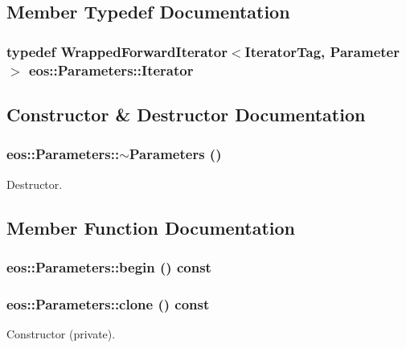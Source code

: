 \subsection{Member Typedef Documentation}
\hypertarget{classeos_1_1Parameters_ad4378a4b3c462f8aa122b3484bce1b4f}{
\subsubsection[{Iterator}]{\setlength{\rightskip}{0pt plus 5cm}typedef {\bf WrappedForwardIterator}$<$IteratorTag, {\bf Parameter}$>$ {\bf eos::Parameters::Iterator}}}
\label{classeos_1_1Parameters_ad4378a4b3c462f8aa122b3484bce1b4f}


\subsection{Constructor \& Destructor Documentation}
\hypertarget{classeos_1_1Parameters_aa1f509653fa20a2599a47706042685f1}{
\subsubsection[{$\sim$Parameters}]{\setlength{\rightskip}{0pt plus 5cm}eos::Parameters::$\sim$Parameters ()}}
\label{classeos_1_1Parameters_aa1f509653fa20a2599a47706042685f1}
Destructor. 

\subsection{Member Function Documentation}
\hypertarget{classeos_1_1Parameters_aeef723f121d249fad9caa45cae111a90}{
\subsubsection[{begin}]{ eos::Parameters::begin () const}}
\label{classeos_1_1Parameters_aeef723f121d249fad9caa45cae111a90}
\hypertarget{classeos_1_1Parameters_a273f5bad065bc47b62981734a2e3576e}{
\subsubsection[{clone}]{ eos::Parameters::clone () const}}
\label{classeos_1_1Parameters_a273f5bad065bc47b62981734a2e3576e}
Constructor (private).

